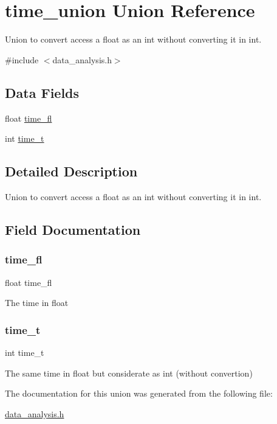 \hypertarget{uniontime__union}{}\section{time\+\_\+union Union Reference}
\label{uniontime__union}


Union to convert access a float as an int without converting it in int.  




{\ttfamily \#include $<$data\+\_\+analysis.\+h$>$}

\subsection*{Data Fields}
\begin{DoxyCompactItemize}
\item 
float \mbox{\hyperlink{uniontime__union_a8811908041d667d8e151a47a5edc24de}{time\+\_\+fl}}
\item 
int \mbox{\hyperlink{uniontime__union_a5cdc7338037dabaa4cafccc0aa0adb05}{time\+\_\+t}}
\end{DoxyCompactItemize}


\subsection{Detailed Description}
Union to convert access a float as an int without converting it in int. 

\subsection{Field Documentation}
\mbox{\label{uniontime__union_a8811908041d667d8e151a47a5edc24de}} 
\subsubsection{\texorpdfstring{time\_fl}{time\_fl}}
{\footnotesize\ttfamily float time\+\_\+fl}

The time in float \mbox{\label{uniontime__union_a5cdc7338037dabaa4cafccc0aa0adb05}} 
\subsubsection{\texorpdfstring{time\_t}{time\_t}}
{\footnotesize\ttfamily int time\+\_\+t}

The same time in float but considerate as int (without convertion) 

The documentation for this union was generated from the following file\+:\begin{DoxyCompactItemize}
\item 
\mbox{\hyperlink{data__analysis_8h}{data\+\_\+analysis.\+h}}\end{DoxyCompactItemize}
